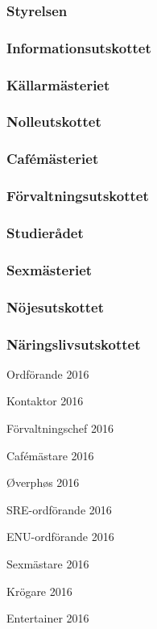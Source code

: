 \documentclass[../_main/handlingar.tex]{subfiles}
\begin{document}

\subsubsection*{Styrelsen}

\subsubsection*{Informationsutskottet}

\subsubsection*{Källarmästeriet}

\subsubsection*{Nolleutskottet}

\subsubsection*{Cafémästeriet}

\subsubsection*{Förvaltningsutskottet}

\subsubsection*{Studierådet}

\subsubsection*{Sexmästeriet}

\subsubsection*{Nöjesutskottet}

\subsubsection*{Näringslivsutskottet}
\newpage
\begin{signatures}{10}
    \mvh
    \signature{Fredrik Peterson}{Ordförande 2016}
    \signature{Erik Månsson}{Kontaktor 2016}
    \signature{Anders Nilsson}{Förvaltningschef 2016}
    \signature{Stephanie Mirsky}{Cafémästare 2016}
    \signature{Molly Rusk}{Øverphøs 2016}
    \signature{Johan Persson}{SRE-ordförande 2016}
    \signature{Johannes Koch}{ENU-ordförande 2016}
    \signature{Martin Gemborn Nilsson}{Sexmästare 2016}
    \signature{Malin Lindström}{Krögare 2016}
    \signature{Dalia Khairallah}{Entertainer 2016}
\end{signatures}
\end{document}
